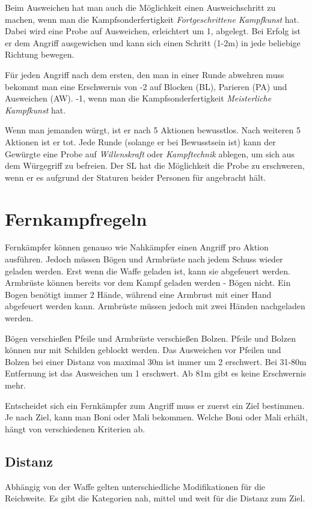 Beim Ausweichen hat man auch die Möglichkeit einen Ausweichschritt zu machen, wenn man die Kampfsonderfertigkeit \textit{Fortgeschrittene Kampfkunst} hat. Dabei wird eine Probe auf Ausweichen, erleichtert um 1, abgelegt. Bei Erfolg ist er dem Angriff ausgewichen und kann sich einen Schritt (1-2m) in jede beliebige Richtung bewegen.

Für jeden Angriff nach dem ersten, den man in einer Runde abwehren muss bekommt man eine Erschwernis von -2 auf Blocken (BL), Parieren (PA) und Ausweichen (AW). -1, wenn man die Kampfsonderfertigkeit \textit{Meisterliche Kampfkunst} hat.

Wenn man jemanden würgt, ist er nach 5 Aktionen bewusstlos. Nach weiteren 5 Aktionen ist er tot. Jede Runde (solange er bei Bewusstsein ist) kann der Gewürgte eine Probe auf \textit{Willenskraft} oder \textit{Kampftechnik} ablegen, um sich aus dem Würgegriff zu befreien. Der SL hat die Möglichkeit die Probe zu erschweren, wenn er es aufgrund der Staturen beider Personen für angebracht hält.

\section{Fernkampfregeln}
Fernkämpfer können genauso wie Nahkämpfer einen Angriff pro Aktion ausführen. Jedoch müssen Bögen und Armbrüste nach jedem Schuss wieder geladen werden. Erst wenn die Waffe geladen ist, kann sie abgefeuert werden. Armbrüste können bereits vor dem Kampf geladen werden - Bögen nicht. Ein Bogen benötigt immer 2 Hände, während eine Armbrust mit einer Hand abgefeuert werden kann. Armbrüste müssen jedoch mit zwei Händen nachgeladen werden. 

Bögen verschießen Pfeile und Armbrüste verschießen Bolzen. Pfeile und Bolzen können nur mit Schilden geblockt werden. Das Ausweichen vor Pfeilen und Bolzen bei einer Distanz von maximal 30m ist immer um 2 erschwert. Bei 31-80m Entfernung ist das Ausweichen um 1 erschwert. Ab 81m gibt es keine Erschwernis mehr.

Entscheidet sich ein Fernkämpfer zum Angriff muss er zuerst ein Ziel bestimmen. Je nach Ziel, kann man Boni oder Mali bekommen. Welche Boni oder Mali erhält, hängt von verschiedenen Kriterien ab.

\subsection{Distanz} 
Abhängig von der Waffe gelten unterschiedliche Modifikationen für die Reichweite. Es gibt die Kategorien nah, mittel und weit für die Distanz zum Ziel.

